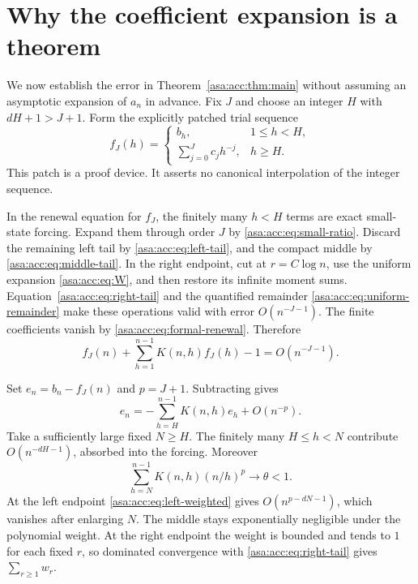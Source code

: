 \documentclass[11pt,letterpaper]{article}
\theoremstyle{remark}\newtheorem{remark}[theorem]{Remark}
\numberwithin{equation}{section}
\begin{document}
\section{Why the coefficient expansion is a theorem}\label{asa:acc:sec:closure}
We now establish the error in Theorem~\ref{asa:acc:thm:main} without assuming an asymptotic expansion of $a_n$ in advance. Fix $J$ and choose an integer $H$ with $dH+1>J+1$. Form the explicitly patched trial sequence
\begin{equation}\label{asa:acc:eq:patch}
f_J(h)=\begin{cases}
b_h,&1\le h<H,\\
\sum_{j=0}^{J}c_jh^{-j},&h\ge H.
\end{cases}
\end{equation}
This patch is a proof device. It asserts no canonical interpolation of the integer sequence.

In the renewal equation for $f_J$, the finitely many $h<H$ terms are exact small-state forcing. Expand them through order $J$ by \eqref{asa:acc:eq:small-ratio}. Discard the remaining left tail by \eqref{asa:acc:eq:left-tail}, and the compact middle by \eqref{asa:acc:eq:middle-tail}. In the right endpoint, cut at $r=C\log n$, use the uniform expansion \eqref{asa:acc:eq:W}, and then restore its infinite moment sums. Equation~\eqref{asa:acc:eq:right-tail} and the quantified remainder \eqref{asa:acc:eq:uniform-remainder} make these operations valid with error $O(n^{-J-1})$. The finite coefficients vanish by \eqref{asa:acc:eq:formal-renewal}. Therefore
\begin{equation}\label{asa:acc:eq:residual}
f_J(n)+\sum_{h=1}^{n-1}K(n,h)f_J(h)-1=O(n^{-J-1}).
\end{equation}

Set $e_n=b_n-f_J(n)$ and $p=J+1$. Subtracting gives
\begin{equation}\label{asa:acc:eq:error-rec}
e_n=-\sum_{h=H}^{n-1}K(n,h)e_h+O(n^{-p}).
\end{equation}
Take a sufficiently large fixed $N\ge H$. The finitely many $H\le h<N$ contribute $O(n^{-dH-1})$, absorbed into the forcing. Moreover
\begin{equation}\label{asa:acc:eq:weighted-contraction}
\sum_{h=N}^{n-1}K(n,h)(n/h)^p\longrightarrow\theta<1.
\end{equation}
At the left endpoint \eqref{asa:acc:eq:left-weighted} gives $O(n^{p-dN-1})$, which vanishes after enlarging $N$. The middle stays exponentially negligible under the polynomial weight. At the right endpoint the weight is bounded and tends to $1$ for each fixed $r$, so dominated convergence with \eqref{asa:acc:eq:right-tail} gives $\sum_{r\ge1}w_r$.
\end{document}

